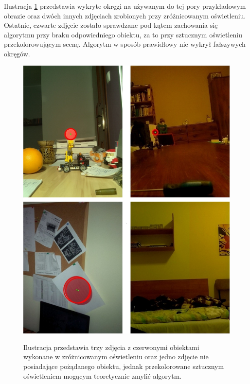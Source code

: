 Ilustracja \ref{przyklady} przedstawia wykryte okręgi na używanym do tej pory przykładowym obrazie oraz dwóch innych zdjęciach zrobionych przy zróżnicowanym oświetleniu. Ostatnie, czwarte zdjęcie zostało sprawdzane pod kątem zachowania się algorytmu przy braku odpowiedniego obiektu, za to przy sztucznym oświetleniu przekolorowującym scenę. Algorytm w sposób prawidłowy nie wykrył fałszywych okręgów.\newpage
\begin{figure}[H]
\begin{center}
\includegraphics[scale=0.6]{imgs/circles.jpg}
\caption[Przykładowe efekty końcowe algorytmu wykrywającego okręgi.]\small{Ilustracja przedstawia trzy zdjęcia z czerwonymi obiektami wykonane w zróżnicowanym oświetleniu oraz jedno zdjęcie nie posiadające pożądanego obiektu, jednak przekolorowane sztucznym oświetleniem mogącym teoretycznie zmylić algorytm.}
\label{przyklady}
\end{center}
\end{figure}
